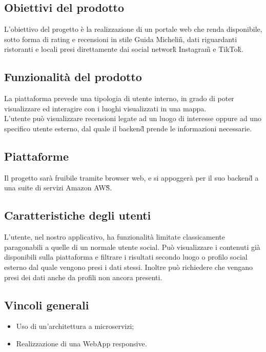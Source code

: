 \subsection{Obiettivi del prodotto}
L'obiettivo del progetto è la realizzazione di un portale web che renda disponibile, sotto forma di rating e recensioni in stile Guida Michelin\G{}, dati riguardanti ristoranti e locali presi direttamente dai social network\G{} Instagram\G{} e TikTok\G{}.

\subsection{Funzionalità del prodotto}
La piattaforma prevede una tipologia di utente interno, in grado di poter visualizzare ed interagire con i luoghi visualizzati in una mappa. \\
L’utente può visualizzare recensioni legate ad un luogo di interesse oppure ad uno specifico utente esterno, dal quale il backend\G{} prende le informazioni necessarie.

\subsection{Piattaforme}
Il progetto sarà fruibile tramite browser web, e si appoggerà per il suo backend\G{} a una suite di servizi Amazon AWS\G{}.

\subsection{Caratteristiche degli utenti}
L'utente, nel nostro applicativo, ha funzionalità limitate classicamente paragonabili a quelle di un normale utente social. Può visualizzare i contenuti già disponibili sulla piattaforma e filtrare i risultati secondo luogo o profilo social esterno dal quale vengono presi i dati stessi. Inoltre può richiedere che vengano presi dei dati anche da profili non ancora presenti.

\subsection{Vincoli generali}
\begin{itemize}
	\item Uso di un'architettura a microservizi;
	\item Realizzazione di una WebApp responsive.
\end{itemize}
